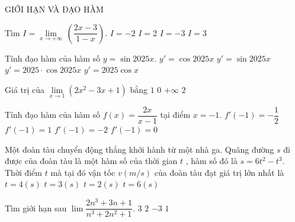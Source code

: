 \begin{dang}
    {GIỚI HẠN VÀ ĐẠO HÀM}
\end{dang}
\begin{ex}
Tìm $I= \lim \limits_{x\to +\infty } \,\left(\dfrac{2x-3}{1-x}\right)$.
\choice
{\True $I=-2$}
{$I=2$}
{$I=-3$}
{$I=3$}
\end{ex}
\begin{ex}
Tính đạo hàm của hàm số $y=\sin 2025x$.
\choice
{$y'=\cos 2025x$}
{$y'=\sin 2025x$}
{\True $y'=2025 \cdot \cos 2025x$}
{$y'=2025\cos x$}
\end{ex}
\begin{ex}
Giá trị của $ \lim \limits_{x\to 1} \left(2x^2-3x+1\right)$ bằng
\choice
{$1$}
{\True $0$}
{$+\infty $}
{$2$}
\end{ex}
\begin{ex}
Tính đạo hàm của hàm số $f(x)=\dfrac{2x}{x-1}$ tại điểm $x=-1$.
\choice
{\True $f'(-1)=-\dfrac{1}{2}$}
{$f'(-1)=1$}
{$f'(-1)=-2$}
{$f'(-1)=0$}
\end{ex}
\begin{ex}
Một đoàn tàu chuyển động thẳng khởi hành từ một nhà ga. Quãng đường $s$ đi được của đoàn tàu là một hàm số của thời gian $t$ , hàm số đó là $s=6t^2-t^3$. Thời điểm $t$ mà tại đó vận tốc $v\left(m/s\right)$ của đoàn tàu đạt giá trị lớn nhất là
\choice
{$t=4(s)$}
{$t=3(s)$}
{\True $t=2(s)$}
{$t=6(s)$}
\end{ex}
\begin{ex}
Tìm giới hạn sau $\lim \dfrac{2n^3+3n+1}{n^3+2n^2+1}$.
\choice
{$3$}
{\True $2$}
{$-3$}
{$1$}
\end{ex}
